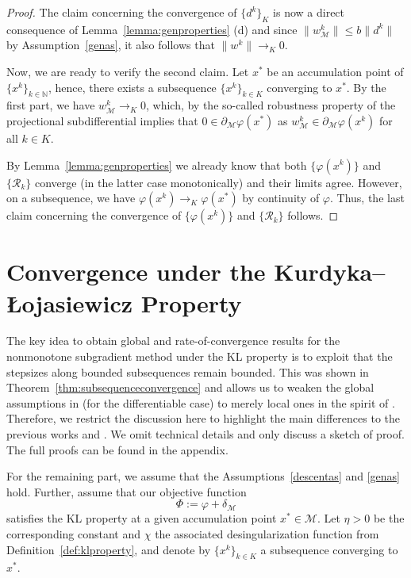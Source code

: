 \documentclass[a4paper, 12pt]{article}
\numberwithin{equation}{section}
\theoremstyle{bolddef}
\theoremstyle{definition}
\theoremstyle{boldplain}
\newcommand{\xk}{x^k}
\newcommand{\wk}{w^k}
\newcommand{\dk}{d^k}
\newcommand{\Rvalue}{\mathcal{R}}
\begin{document}
\begin{proof}
The claim concerning the convergence of $\{\dk\}_K$ is now a direct consequence of Lemma~\ref{lemma:genproperties} (d) and since $\| \wk_\mathcal{M} \| \leq b \|\dk \|$ by Assumption~\ref{genas}, it also follows that $\|\wk\| \to_K 0$.

Now, we are ready to verify the second claim. Let $x^*$ be an accumulation point of $\{\xk\}_{k \in \mathbb{N}}$, hence, there exists a subsequence $\{ \xk \}_{k \in K}$ converging to $x^*$. By the first part, we have $\wk_\mathcal{M} \to_K 0$, which, by the so-called robustness property of the projectional subdifferential implies that 
$0 \in \partial_\mathcal{M} \varphi(x^*)$ as $\wk_\mathcal{M} \in \partial_\mathcal{M} \varphi (\xk)$ for all $k \in K$.

By Lemma~\ref{lemma:genproperties} we already know that both $\{\varphi(\xk)\}$ and $\{\Rvalue_k\}$ converge (in the latter case monotonically) and their limits agree. However, on a subsequence, we have $\varphi(\xk) \to_K \varphi(x^*)$ by continuity of $\varphi$. Thus, the last claim concerning the convergence of $\{\varphi(\xk)\}$ and $\{\Rvalue_k\}$ follows.
\end{proof}

\section{Convergence under the Kurdyka–Łojasiewicz Property}\label{Sec:KL}

The key idea to obtain global and rate-of-convergence results for the nonmonotone subgradient method under the KL property is to exploit that the stepsizes along bounded subsequences remain bounded. This was shown in Theorem~\ref{thm:subsequenceconvergence} and allows us to weaken the global assumptions in \cite{Qian2024} (for the differentiable case) to merely local ones in the spirit of \cite{kanzow2025}. Therefore, we restrict the discussion here to highlight the main differences to the previous works \cite{kanzow2025} and \cite{Qian2024}. We omit technical details and only discuss a sketch of proof. The full proofs can be found in the appendix.

For the remaining part, we assume that the Assumptions~\ref{descentas} and \ref{genas} hold. Further, assume that our objective function 
\begin{equation*}
	\Phi := \varphi + \delta_\mathcal{M}
\end{equation*}
satisfies the KL property at a given accumulation point $x^* \in \mathcal{M}$. Let $\eta > 0$ be the corresponding constant and $\chi$ the associated desingularization function from Definition~\ref{def:klproperty}, and denote by $\{\xk \}_{k \in K}$ a subsequence converging to $x^*$. 
\end{document}
